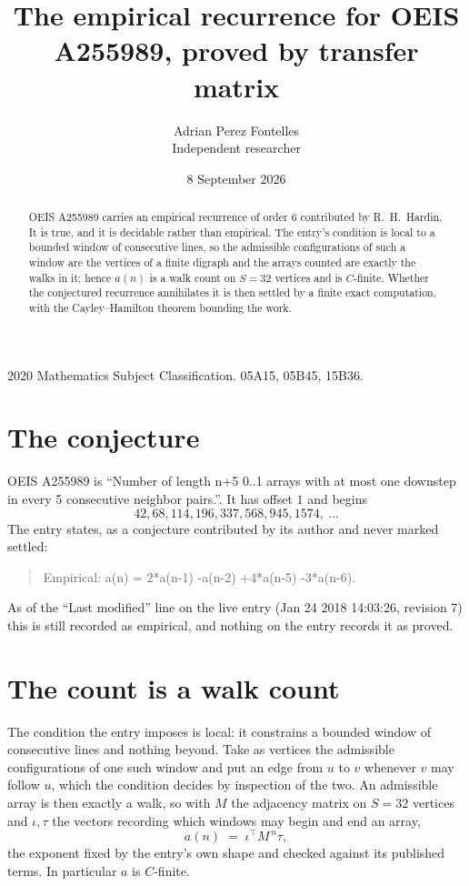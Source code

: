 \documentclass[11pt,a4paper]{article}
\title{The empirical recurrence for OEIS A255989, proved by transfer matrix}
\author{Adrian Perez Fontelles\\ \small Independent researcher}
\date{8 September 2026}
\theoremstyle{plain}
\theoremstyle{definition}
\begin{document}
\maketitle

\begin{abstract}
OEIS A255989 carries an empirical recurrence of order $6$ contributed by R.~H.~Hardin. It is
true, and it is decidable rather than empirical. The entry's condition is local to a bounded window of consecutive lines, so
the admissible configurations of such a window are the vertices of a finite digraph and the
arrays counted are exactly the walks in it; hence $a(n)$ is a walk count on $S=32$ vertices
and is $C$-finite. Whether the conjectured recurrence annihilates it is then settled by a
finite exact computation, with the Cayley--Hamilton theorem bounding the work.
\end{abstract}

\noindent\small 2020 Mathematics Subject Classification. 05A15, 05B45, 15B36.\normalsize

\section{The conjecture}

OEIS A255989 is ``Number of length n+5 0..1 arrays with at most one downstep in every 5 consecutive neighbor pairs.''. It has offset $1$ and begins
\[
42, 68, 114, 196, 337, 568, 945, 1574,\ \dots
\]
The entry states, as a conjecture contributed by its author and never marked settled:
\begin{quote}
Empirical: a(n) = 2*a(n-1) -a(n-2) +4*a(n-5) -3*a(n-6).
\end{quote}
As of the ``Last modified'' line on the live entry (Jan 24 2018 14:03:26, revision 7) this is still
recorded as empirical, and nothing on the entry records it as proved.

\section{The count is a walk count}

The condition the entry imposes is local: it constrains a bounded window of consecutive lines and nothing beyond. Take as
vertices the admissible configurations of one such window and put an edge from $u$ to $v$
whenever $v$ may follow $u$, which the condition decides by inspection of the two. An
admissible array is then exactly a walk, so with $M$ the adjacency matrix on $S=32$ vertices
and $\iota,\tau$ the vectors recording which windows may begin and end an array,
\[
a(n)\;=\;\iota^{\!\top}M^{\,n}\tau ,
\]
the exponent fixed by the entry's own shape and checked against its published terms. In
particular $a$ is $C$-finite.
\end{document}

